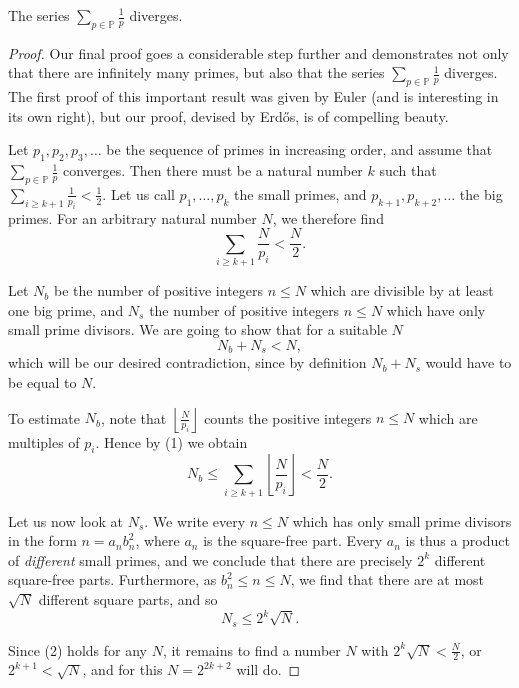 \begin{theorem}
    \label{thm:sixth_proof}
    \leanok
    The series \(\sum_{p\in\mathbb{P}}\frac 1 p\) diverges.
\end{theorem}
\begin{proof}
    Our final proof goes a considerable step further and demonstrates not only that there are infinitely many primes,
    but also that the series \(\sum_{p \in \mathbb{P}} \frac{1}{p}\) diverges.
    The first proof of this important result was given by Euler (and is interesting in its own right), but our proof, devised by Erdős, is of compelling beauty.

    Let \(p_1, p_2, p_3, \dots\) be the sequence of primes in increasing order, and assume that \(\sum_{p \in \mathbb{P}} \frac{1}{p}\) converges.
    Then there must be a natural number \(k\) such that \(\sum_{i \geq k+1} \frac{1}{p_i} < \frac{1}{2}\).
    Let us call \(p_1, \dots, p_k\) the small primes, and \(p_{k+1}, p_{k+2}, \dots\) the big primes. For an arbitrary natural number \(N\), we therefore find
    \[
    \sum_{i \geq k+1} \frac{N}{p_i} < \frac{N}{2}. \tag{1}
    \]

    Let \(N_b\) be the number of positive integers \(n \leq N\) which are divisible by at least one big prime,
    and \(N_s\) the number of positive integers \(n \leq N\) which have only small prime divisors. We are going to show that for a suitable \(N\)
    \[
    N_b + N_s < N,
    \]
    which will be our desired contradiction, since by definition \(N_b + N_s\) would have to be equal to \(N\).

    To estimate \(N_b\), note that \(\left\lfloor \frac{N}{p_i} \right\rfloor\) counts the positive
    integers \(n \leq N\) which are multiples of \(p_i\). Hence by (1) we obtain
    \[
    N_b \leq \sum_{i \geq k+1} \left\lfloor \frac{N}{p_i} \right\rfloor < \frac{N}{2}. \tag{2}
    \]
    
    Let us now look at \(N_s\). We write every \(n \leq N\) which has only small prime
    divisors in the form \(n = a_n b_n^2\), where \(a_n\) is the square-free part. Every \(a_n\)
    is thus a product of \emph{different} small primes, and we conclude that there are precisely \(2^k\)
    different square-free parts. Furthermore, as \(b_n^2 \leq n \leq N\), we find that there are at most \(\sqrt{N}\) different square parts, and so
    \[
    N_s \leq 2^k \sqrt{N}.
    \]

    Since (2) holds for any \(N\), it remains to find a number \(N\) with \(2^k \sqrt{N} < \frac{N}{2}\), or \(2^{k+1} < \sqrt{N}\), and for this \(N = 2^{2k+2}\) will do.
\end{proof}



